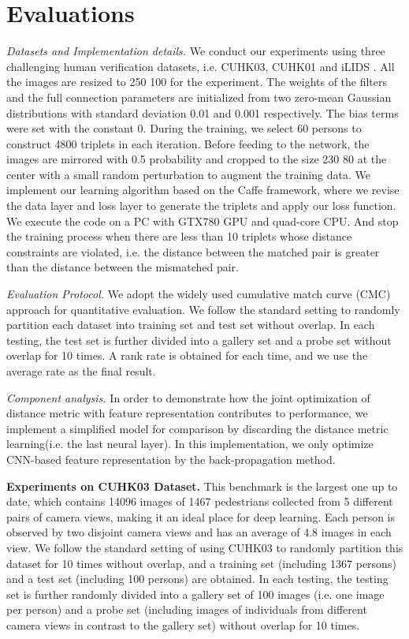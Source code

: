 \documentclass[letterpaper]{article}
\begin{document}
\section{Evaluations}

{\em Datasets and Implementation details.} We conduct our experiments using three challenging human verification datasets, i.e. CUHK03\cite{li2014deepreid}, CUHK01\cite{li2012human} and iLIDS\cite{zheng2009people} . All the images are resized to 250  100 for the experiment. The weights of the filters and the full connection parameters are initialized from two zero-mean Gaussian distributions with standard deviation 0.01 and 0.001 respectively. The bias terms were set with the constant 0. During the training, we select 60 persons to construct 4800 triplets in each iteration. Before feeding to the network, the images are mirrored with 0.5 probability and cropped to the size 230  80 at the center with a small random perturbation to augment the training data.  We implement our learning algorithm based on the Caffe framework, where we revise the data layer and loss layer to generate the triplets and apply our loss function. We execute the code on a PC with GTX780 GPU and quad-core CPU. And stop the training process when there are less than 10 triplets whose distance constraints are violated, i.e. the distance between the matched pair is greater than the distance between the mismatched pair.

{\em Evaluation Protocol.} We adopt the widely used cumulative match curve (CMC) approach \cite{gray2007evaluating} for quantitative evaluation. We follow the standard setting to randomly partition each dataset into training set and test set without overlap. In each testing, the test set is further divided into a gallery set and a probe set without overlap for 10 times. A rank  rate is obtained for each time, and we use the average rate as the final result.

{\em Component analysis.} In order to demonstrate how the joint optimization of distance metric with feature representation contributes to performance, we implement a simplified model for comparison by discarding the distance metric learning(i.e. the last neural layer). In this implementation, we only optimize CNN-based feature representation by the back-propagation method.




\textbf{Experiments on CUHK03 Dataset.} This benchmark \cite{li2014deepreid} is  the largest one up to date, which contains 14096 images of 1467 pedestrians collected from 5 different pairs of camera views, making it an ideal place for deep learning. Each person is observed by two disjoint camera views and has an average of 4.8 images in each view. We follow the standard setting of using CUHK03 to randomly partition this dataset for 10 times without overlap, and a training set (including 1367 persons) and a test set (including 100 persons) are obtained. In each testing, the testing set is further randomly divided into a gallery set of 100 images (i.e. one image per person) and a probe set (including images of individuals from different camera views in contrast to the gallery set) without overlap for 10 times.
\end{document}
